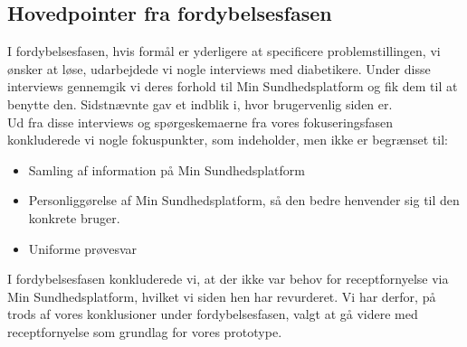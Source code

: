 \subsection{Hovedpointer fra fordybelsesfasen}
I fordybelsesfasen, hvis formål er yderligere at specificere problemstillingen, vi ønsker at løse, udarbejdede vi nogle interviews med diabetikere. Under disse interviews gennemgik vi deres forhold til Min Sundhedsplatform og fik dem til at benytte den. Sidstnævnte gav et indblik i, hvor brugervenlig siden er.\\
Ud fra disse interviews og spørgeskemaerne fra vores fokuseringsfasen konkluderede vi nogle fokuspunkter, som indeholder, men ikke er begrænset til:
\begin{itemize}
  \item Samling af information på Min Sundhedsplatform
  \item Personliggørelse af Min Sundhedsplatform, så den bedre henvender sig til den konkrete bruger.
  \item Uniforme prøvesvar
\end{itemize}
I fordybelsesfasen konkluderede vi, at der ikke var behov for receptfornyelse via Min Sundhedsplatform, hvilket vi siden hen har revurderet. Vi har derfor, på trods af vores konklusioner under fordybelsesfasen, valgt at gå videre med receptfornyelse som grundlag for vores prototype. 

